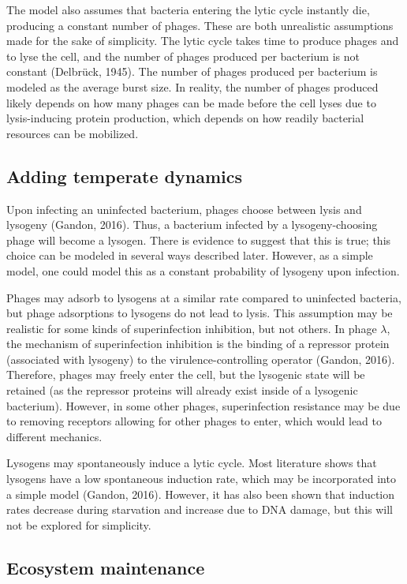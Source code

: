 \documentclass{article}
\begin{document}
The model also assumes that bacteria entering the lytic cycle instantly die, producing a constant number of phages. These are both unrealistic assumptions made for the sake of simplicity. The lytic cycle takes time to produce phages and to lyse the cell, and the number of phages produced per bacterium is not constant (Delbrück, 1945). The number of phages produced per bacterium is modeled as the average burst size. In reality, the number of phages produced likely depends on how many phages can be made before the cell lyses due to lysis-inducing protein production, which depends on how readily bacterial resources can be mobilized. 

\subsection{Adding temperate dynamics}

Upon infecting an uninfected bacterium, phages choose between lysis and lysogeny (Gandon, 2016). Thus, a bacterium infected by a lysogeny-choosing phage will become a lysogen. There is evidence to suggest that this is true; this choice can be modeled in several ways described later. However, as a simple model, one could model this as a constant probability of lysogeny upon infection. 

Phages may adsorb to lysogens at a similar rate compared to uninfected bacteria, but phage adsorptions to lysogens do not lead to lysis. This assumption may be realistic for some kinds of superinfection inhibition, but not others. In phage $\lambda$, the mechanism of superinfection inhibition is the binding of a repressor protein (associated with lysogeny) to the virulence-controlling operator (Gandon, 2016). Therefore, phages may freely enter the cell, but the lysogenic state will be retained (as the repressor proteins will already exist inside of a lysogenic bacterium). However, in some other phages, superinfection resistance may be due to removing receptors allowing for other phages to enter, which would lead to different mechanics. 

Lysogens may spontaneously induce a lytic cycle. Most literature shows that lysogens have a low spontaneous induction rate, which may be incorporated into a simple model (Gandon, 2016). However, it has also been shown that induction rates decrease during starvation and increase due to DNA damage, but this will not be explored for simplicity.

\subsection{Ecosystem maintenance}
\end{document}
